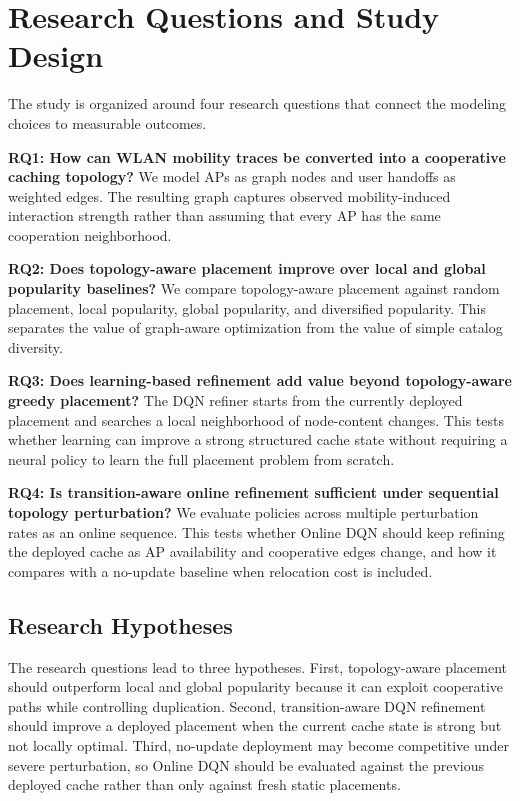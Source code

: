 \section{Research Questions and Study Design}

The study is organized around four research questions that connect the modeling choices to measurable outcomes.

\textbf{RQ1: How can WLAN mobility traces be converted into a cooperative caching topology?}
We model APs as graph nodes and user handoffs as weighted edges. The resulting graph captures observed mobility-induced interaction strength rather than assuming that every AP has the same cooperation neighborhood.

\textbf{RQ2: Does topology-aware placement improve over local and global popularity baselines?}
We compare topology-aware placement against random placement, local popularity, global popularity, and diversified popularity. This separates the value of graph-aware optimization from the value of simple catalog diversity.

\textbf{RQ3: Does learning-based refinement add value beyond topology-aware greedy placement?}
The DQN refiner starts from the currently deployed placement and searches a local neighborhood of node-content changes. This tests whether learning can improve a strong structured cache state without requiring a neural policy to learn the full placement problem from scratch.

\textbf{RQ4: Is transition-aware online refinement sufficient under sequential topology perturbation?}
We evaluate policies across multiple perturbation rates as an online sequence. This tests whether Online DQN should keep refining the deployed cache as AP availability and cooperative edges change, and how it compares with a no-update baseline when relocation cost is included.

\subsection{Research Hypotheses}

The research questions lead to three hypotheses. First, topology-aware placement should outperform local and global popularity because it can exploit cooperative paths while controlling duplication. Second, transition-aware DQN refinement should improve a deployed placement when the current cache state is strong but not locally optimal. Third, no-update deployment may become competitive under severe perturbation, so Online DQN should be evaluated against the previous deployed cache rather than only against fresh static placements.

